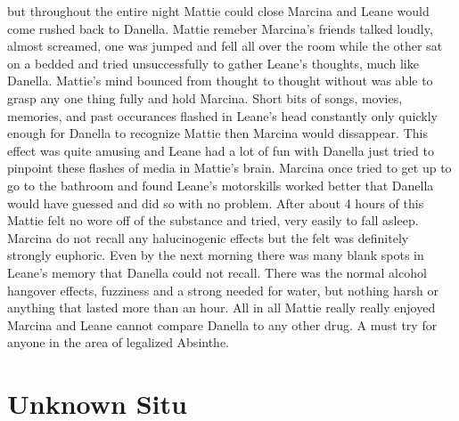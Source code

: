 \documentclass[12pt]{book}
\begin{document}
but throughout the entire night Mattie could close Marcina and Leane would come rushed back to Danella. Mattie remeber Marcina's friends talked loudly, almost screamed, one was jumped and fell all over the room while the other sat on a bedded and tried unsuccessfully to gather Leane's thoughts, much like Danella. Mattie's mind bounced from thought to thought without was able to grasp any one thing fully and hold Marcina. Short bits of songs, movies, memories, and past occurances flashed in Leane's head constantly only quickly enough for Danella to recognize Mattie then Marcina would dissappear. This effect was quite amusing and Leane had a lot of fun with Danella just tried to pinpoint these flashes of media in Mattie's brain. Marcina once tried to get up to go to the bathroom and found Leane's motorskills worked better that Danella would have guessed and did so with no problem. After about 4 hours of this Mattie felt no wore off of the substance and tried, very easily to fall asleep. Marcina do not recall any halucinogenic effects but the felt was definitely strongly euphoric. Even by the next morning there was many blank spots in Leane's memory that Danella could not recall. There was the normal alcohol hangover effects, fuzziness and a strong needed for water, but nothing harsh or anything that lasted more than an hour. All in all Mattie really really enjoyed Marcina and Leane cannot compare Danella to any other drug. A must try for anyone in the area of legalized Absinthe.



\chapter{Unknown Situ}
\end{document}
